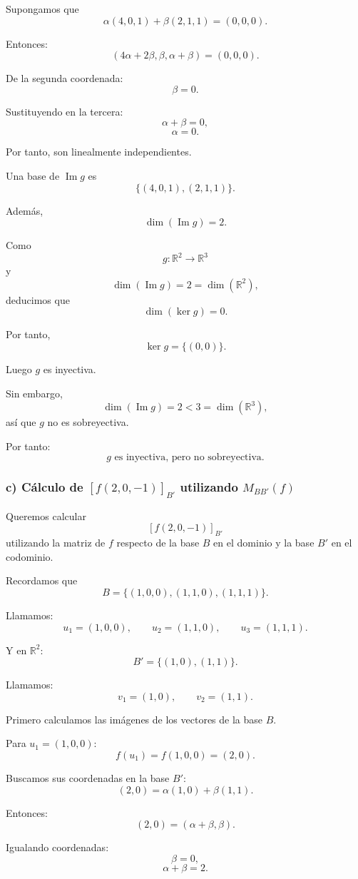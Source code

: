 \documentclass[12pt]{article}
\begin{document}
Supongamos que
\[
\alpha(4,0,1)+\beta(2,1,1)=(0,0,0).
\]

Entonces:
\[
(4\alpha+2\beta,\beta,\alpha+\beta)=(0,0,0).
\]

De la segunda coordenada:
\[
\beta=0.
\]

Sustituyendo en la tercera:
\[
\alpha+\beta=0,
\]
\[
\alpha=0.
\]

Por tanto, son linealmente independientes.

Una base de \(\operatorname{Im} g\) es
\[
\boxed{\{(4,0,1),(2,1,1)\}.}
\]

Además,
\[
\dim(\operatorname{Im} g)=2.
\]

Como
\[
g:\mathbb{R}^2\longrightarrow \mathbb{R}^3
\]
y
\[
\dim(\operatorname{Im} g)=2=\dim(\mathbb{R}^2),
\]
deducimos que
\[
\dim(\ker g)=0.
\]

Por tanto,
\[
\ker g=\{(0,0)\}.
\]

Luego \(g\) es inyectiva.

Sin embargo,
\[
\dim(\operatorname{Im} g)=2<3=\dim(\mathbb{R}^3),
\]
así que \(g\) no es sobreyectiva.

Por tanto:
\[
\boxed{g \text{ es inyectiva, pero no sobreyectiva.}}
\]

\subsubsection*{c) Cálculo de \([f(2,0,-1)]_{B'}\) utilizando \(M_{BB'}(f)\)}

Queremos calcular
\[
[f(2,0,-1)]_{B'}
\]
utilizando la matriz de \(f\) respecto de la base \(B\) en el dominio y la base \(B'\) en el codominio.

Recordamos que
\[
B=\{(1,0,0),(1,1,0),(1,1,1)\}.
\]

Llamamos:
\[
u_1=(1,0,0),
\qquad
u_2=(1,1,0),
\qquad
u_3=(1,1,1).
\]

Y en \(\mathbb{R}^2\):
\[
B'=\{(1,0),(1,1)\}.
\]

Llamamos:
\[
v_1=(1,0),
\qquad
v_2=(1,1).
\]

Primero calculamos las imágenes de los vectores de la base \(B\).

Para \(u_1=(1,0,0)\):
\[
f(u_1)=f(1,0,0)=(2,0).
\]

Buscamos sus coordenadas en la base \(B'\):
\[
(2,0)=\alpha(1,0)+\beta(1,1).
\]

Entonces:
\[
(2,0)=(\alpha+\beta,\beta).
\]

Igualando coordenadas:
\[
\beta=0,
\]
\[
\alpha+\beta=2.
\]
\end{document}
